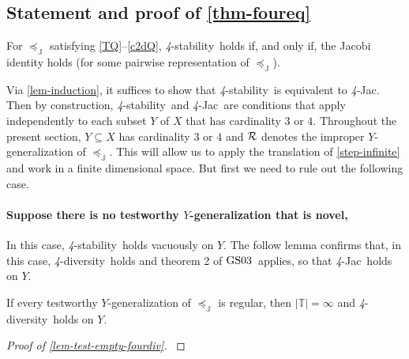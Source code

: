 \documentclass[12pt,a4paper,twoside]{article}
\makeatletter
\newcommand{\srcsize}{\@setfontsize{\srcsize}{3pt}{3pt}}
\newcommand{\gsii}{$\textup{GS03}$}
\newcommand\mplus{\text{\srcsize$+$}}
\newcommand{\ext}{\mathrel{\mc R}}
\newcommand{\mbbc}{{\mathds C}}
\newcommand{\mbbt}{{\mathds {T}}}
\newcommand{\mbbj}{\mathds J}
\newcommand{\stability}{\textit{4}-\textup{{stability}}}
\newcommand{\fourdiv}{\textit{4}-\textup{diversity}}
\newcommand{\fourjac}{\textup{\textit{4}-Jac}}
\makeatother
\begin{document}
\begin{appendices}
\section{Statement and proof of \cref{thm-foureq}}\label{sec-proof-foureq}
 \begin{theorem}\label{thm-foureq}
   For $\preceq_{\mbbj}$ satisfying \ref{TQ}--\ref{c2dQ}, \stability\ holds if,
   and only if, the Jacobi identity holds (for some pairwise representation of
   $\preceq_{\mbbj}$).
 \end{theorem}
 Via \cref{lem-induction}, it suffices to show that \stability\ is equivalent to
 \fourjac. Then by construction, \stability\ and \fourjac\ are conditions that
 apply independently to each subset $Y$ of $X$ that has cardinality $3$ or $4$.
 Throughout the present section, $Y\subseteq X$ has cardinality $3$ or $4$ and
 $\ext$ denotes the improper $Y$-{generalization} of $\preceq_{\mbbj}$. This will
 allow us to apply the translation of \cref{step-infinite} and work in a finite
 dimensional space. But first we need to rule out the following case.
 \paragraph{Suppose there is no testworthy $Y$-{generalization} that is
 novel,}\hskip-7pt In this case, \stability\ holds vacuously on $Y$. The follow
 lemma confirms that, in this case, \fourdiv\ holds and theorem 2 of \gsii\
 applies, so that \fourjac\ holds on $Y$.
\begin{lemma}\label{lem-test-empty-fourdiv}
  If every testworthy $Y$-{generalization} of $\preceq_{\mbbj}$ is regular, then
  $\lvert \mbbt \rvert = \infty$ and \fourdiv\ holds on $Y$.
\end{lemma}

\begin{proof}[Proof of \cref{lem-test-empty-fourdiv}] \label{proof-test-empty-fourdiv}


\end{proof}
\end{appendices}
\end{document}
